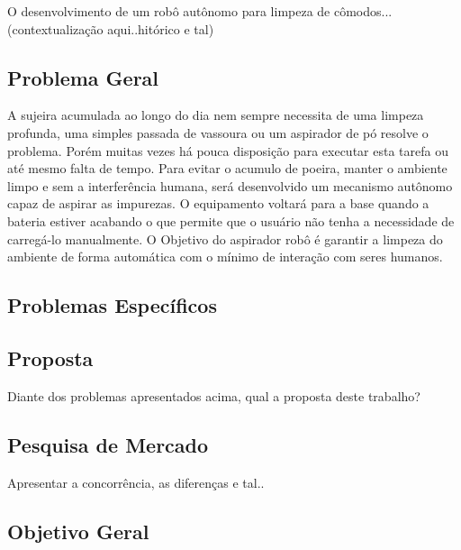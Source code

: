 O desenvolvimento de um robô autônomo para limpeza de cômodos... (contextualização aqui..hitórico e tal)

\subsection{Problema Geral} %
\label{sub:problemaGeral}

A sujeira acumulada ao longo do dia nem sempre necessita de uma limpeza profunda, uma simples passada de vassoura ou um aspirador de pó resolve o problema. Porém muitas vezes há pouca disposição para executar esta tarefa ou até mesmo falta de tempo. Para evitar o acumulo de poeira, manter o ambiente limpo e sem a interferência humana, será desenvolvido um mecanismo autônomo capaz de aspirar as impurezas. O equipamento voltará para a base quando a bateria estiver acabando o que permite que o usuário não tenha a necessidade de carregá-lo manualmente. O Objetivo do aspirador robô é garantir a limpeza do ambiente de forma automática com o mínimo de interação com seres humanos.


\subsection{Problemas Específicos} %
\label{sub:problemas_específicos}


\subsection{Proposta} %
\label{sub:proposta}
	Diante dos problemas apresentados acima, qual a proposta deste trabalho?

\subsection{Pesquisa de Mercado} %
\label{sub:pesquisa_de_mercado}
Apresentar a concorrência, as diferenças e tal..

\subsection{Objetivo Geral} %
\label{sub:objetivo_geral}


